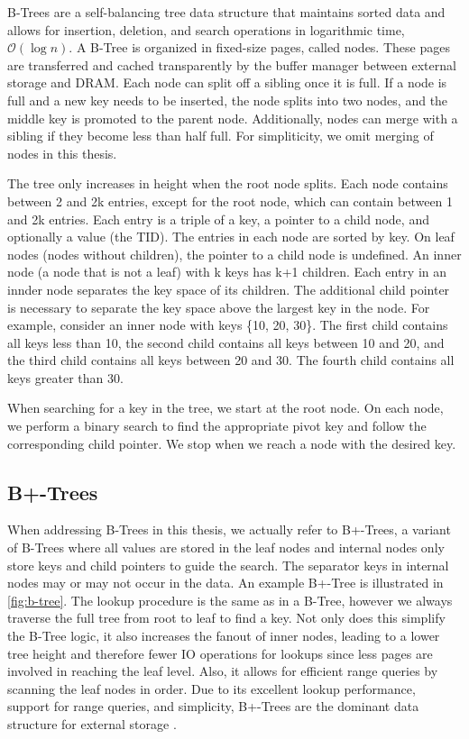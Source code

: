 B-Trees \cite{bayer1970organization} are a self-balancing tree data structure that maintains sorted data and allows for insertion, deletion, and search operations in logarithmic time, $\mathcal{O}(\log n)$.
A B-Tree is organized in fixed-size pages, called nodes. These pages are transferred and cached transparently by the buffer manager between external storage and \ac{DRAM}.
Each node can split off a sibling once it is full. If a node is full and a new key needs to be inserted, the node splits into two nodes, and the middle key is promoted to the parent node.
Additionally, nodes can merge with a sibling if they become less than half full. For simpliticity, we omit merging of nodes in this thesis.

The tree only increases in height when the root node splits.
Each node contains between 2 and 2k entries, except for the root node, which can contain between 1 and 2k entries.
Each entry is a triple of a key, a pointer to a child node, and optionally a value (the \ac{TID}).
The entries in each node are sorted by key. On leaf nodes (nodes without children), the pointer to a child node is undefined.
An inner node (a node that is not a leaf) with k keys has k+1 children.
Each entry in an innder node separates the key space of its children.
The additional child pointer is necessary to separate the key space above the largest key in the node.
For example, consider an inner node with keys \{10, 20, 30\}.
The first child contains all keys less than 10, the second child contains all keys between 10 and 20, and the third child contains all keys between 20 and 30. 
The fourth child contains all keys greater than 30.

When searching for a key in the tree, we start at the root node.
On each node, we perform a binary search to find the appropriate pivot key and follow the corresponding child pointer.
We stop when we reach a node with the desired key.

\subsection*{B+-Trees}
When addressing B-Trees in this thesis, we actually refer to B+-Trees, a variant of B-Trees where all values are stored in the leaf nodes and internal nodes only store keys and child pointers to guide the search.
The separator keys in internal nodes may or may not occur in the data. An example B+-Tree is illustrated in \autoref{fig:b-tree}.
The lookup procedure is the same as in a B-Tree, however we always traverse the full tree from root to leaf to find a key.
Not only does this simplify the B-Tree logic, it also increases the fanout of inner nodes, leading to a lower tree height and therefore fewer \ac{IO} operations for lookups since less pages are involved in reaching the leaf level.
Also, it allows for efficient range queries by scanning the leaf nodes in order.
Due to its excellent lookup performance, support for range queries, and simplicity, B+-Trees are the dominant data structure for external storage \cite{mdbs2024slides}.

